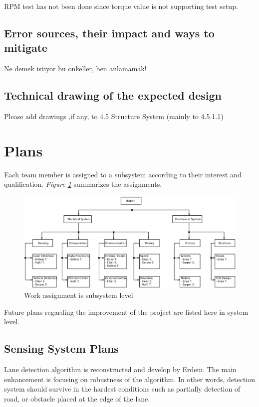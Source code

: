 \documentclass[a4paper,12pt]{article}
\begin{document}
	RPM test has not been done since torque value is not supporting test setup.
	
	\newpage
	\subsection{ Error sources, their impact and ways to mitigate}
	
	Ne demek istiyor bu onkeller, ben anlamamak!
	
	\subsection{Technical drawing of the expected design}
	
	Please add drawings ,if any, to 4.5 Structure System (mainly to 4.5.1.1)
	
	
	
	\section{Plans}
	Each team member is assigned to a subsystem according to their interest and qualification. \textit{Figure \ref{fig:plan-org}} summarizes the assignments.
	\begin{figure}[h]
		\includegraphics[width=\textwidth,center]{images/plan-organization}
		\caption{Work assignment is subsystem level}\label{fig:plan-org}
	\end{figure}
	Future plans regarding the improvement of the project are listed here in system level.
	\subsection{Sensing System Plans}
	Lane detection algorithm is reconstructed and develop by Erdem. The main enhancement is focusing on robustness of the algorithm. In other words, detection system should survive in the hardest conditions such as partially detection of road, or obstacle placed at the edge of the lane.\\
	   
\end{document}
